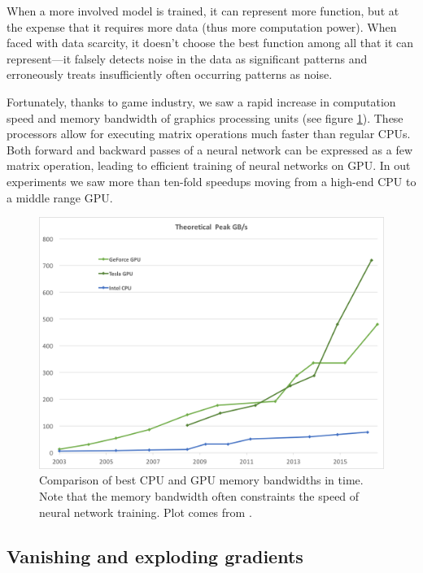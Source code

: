 When a more involved model is trained, it can represent more function, but at the expense that it requires more data (thus more computation power). When faced with data scarcity, it doesn't choose the best function among all that it can represent---it falsely detects noise in the data as significant patterns and erroneously treats insufficiently often occurring patterns as noise.

Fortunately, thanks to game industry, we saw a rapid increase in computation speed and memory bandwidth of graphics processing units (see figure \ref{nvidia-speed}). These processors allow for executing matrix operations much faster than regular CPUs. Both forward and backward passes of a neural network can be expressed as a few matrix operation, leading to efficient training of neural networks on GPU. In out experiments we saw more than ten-fold speedups moving from a high-end CPU to a middle range GPU.

\begin{figure}[h]
  \includegraphics[width=\linewidth]{images/gpu-bandwidth.png}
  \caption{Comparison of best CPU and GPU memory bandwidths in time. Note that the memory bandwidth often constraints the speed of neural network training. Plot comes from \cite{nvidia-docs}.}\label{nvidia-speed}
\end{figure}

\subsection{Vanishing and exploding gradients}


